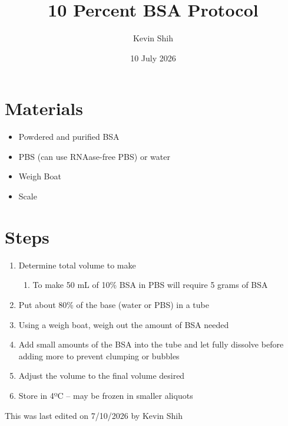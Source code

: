 \documentclass[
]{article}
\title{10 Percent BSA Protocol}
\author{Kevin Shih}
\date{10 July 2026}
\providecommand{\tightlist}{%
  \setlength{\itemsep}{0pt}\setlength{\parskip}{0pt}}
\begin{document}
\maketitle

{
\setcounter{tocdepth}{5}
\tableofcontents
}
\section{Materials}\label{materials}

\begin{itemize}
\tightlist
\item
  Powdered and purified BSA
\item
  PBS (can use RNAase-free PBS) or water
\item
  Weigh Boat
\item
  Scale
\end{itemize}

\section{Steps}\label{steps}

\begin{enumerate}
\def\labelenumi{\arabic{enumi}.}
\tightlist
\item
  Determine total volume to make

  \begin{enumerate}
  \def\labelenumii{\alph{enumii}.}
  \tightlist
  \item
    To make 50 mL of 10\% BSA in PBS will require 5 grams of BSA
  \end{enumerate}
\item
  Put about 80\% of the base (water or PBS) in a tube
\item
  Using a weigh boat, weigh out the amount of BSA needed
\item
  Add small amounts of the BSA into the tube and let fully dissolve
  before adding more to prevent clumping or bubbles
\item
  Adjust the volume to the final volume desired
\item
  Store in 4ºC -- may be frozen in smaller aliquots
\end{enumerate}

This was last edited on 7/10/2026 by Kevin Shih
\end{document}
